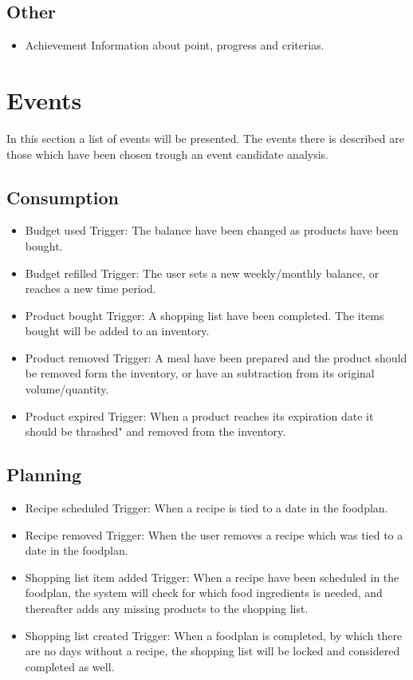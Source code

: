 \subsection{Other}
\begin{itemize}
\item Achievement
    \subitem Information about point, progress and criterias. %
\end{itemize}

\section{Events}
In this section a list of events will be presented. The events there is described are those which have been chosen trough an event candidate analysis.
\subsection{Consumption}
\begin{itemize}
\item Budget used
    \subitem Trigger: The balance have been changed as products have been bought.
\item Budget refilled
    \subitem Trigger: The user sets a new weekly/monthly balance, or reaches a new time period.
\item Product bought
    \subitem Trigger: A shopping list have been completed. The items bought will be added to an inventory.
\item Product removed
    \subitem Trigger: A meal have been prepared and the product should be removed form the inventory, or have an subtraction from its original volume/quantity.
\item Product expired
    \subitem Trigger: When a product reaches its expiration date it should be thrashed" and removed from the inventory.
\end{itemize}

\subsection{Planning}
\begin{itemize}
    \item Recipe scheduled
        \subitem Trigger: When a recipe is tied to a date in the foodplan.
    \item Recipe removed
        \subitem Trigger: When the user removes a recipe which was tied to a date in the foodplan.
    \item Shopping list item added
        \subitem Trigger: When a recipe have been scheduled in the foodplan, the system will check for which food ingredients is needed, and thereafter adds any missing products to the shopping list.
    \item Shopping list created
        \subitem Trigger: When a foodplan is completed, by which there are no days without a recipe, the shopping list will be locked and considered completed as well.
\end{itemize}

